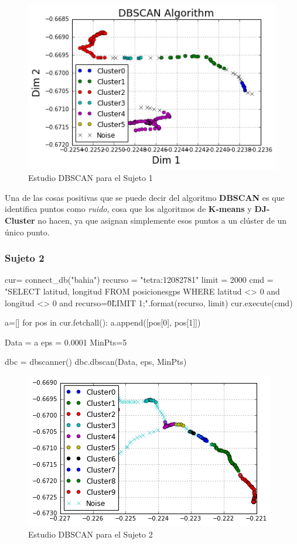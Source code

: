 \documentclass[a4paper, 12pt]{article}
\begin{document}
\begin{figure}[H]
	\includegraphics[scale=.7]{../comparativa/dbscanSujeto1.png}
	\caption{Estudio DBSCAN para el Sujeto 1}
\end{figure}

Una de las cosas positivas que se puede decir del algoritmo \textbf{DBSCAN} es que identifica puntos como \textit{ruido}, cosa que los algoritmos de \textbf{K-means} y \textbf{DJ-Cluster} no hacen, ya que asignan simplemente esos puntos a un cl\'uster de un \'unico punto.\\

\subsubsection{Sujeto 2}

\begin{python}
cur= connect_db("bahia")
recurso = "tetra:12082781"
limit = 2000
cmd = "SELECT latitud, longitud 
		FROM posicionesgps 
		WHERE latitud <> 0 and longitud <> 0 and recurso=\"{0}\" 
		LIMIT {1};".format(recurso, limit)
cur.execute(cmd)

a=[]
for pos in cur.fetchall():
    a.append([pos[0], pos[1]])

Data = a
eps = 0.0001
MinPts=5

dbc = dbscanner()
dbc.dbscan(Data, eps, MinPts)
\end{python}

\begin{figure}[H]
	\includegraphics[scale=.7]{../comparativa/dbscanSujeto2.png}
	\caption{Estudio DBSCAN para el Sujeto 2}
\end{figure}
\end{document}
